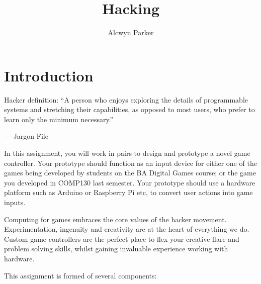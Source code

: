 \documentclass{../fal_assignment}
\title{Hacking }
\author{Alcwyn Parker}
\begin{document}
\maketitle

\section*{Introduction}

\begin{marginquote}
Hacker definition: ``A person who enjoys exploring the details of programmable systems and stretching their capabilities, as opposed to most users, who prefer to learn only the minimum necessary.''

--- Jargon File

\end{marginquote}

In this assignment, you will work in pairs to design and prototype a novel game controller. Your prototype should function as an input device for either one of the games being developed by students on the BA Digital Games course; or the game you developed in COMP130 last semester. Your prototype should use a hardware platform such as Arduino or Raspberry Pi etc, to convert user actions into game inputs. 

Computing for games embraces the core values of the hacker movement.  Experimentation, ingenuity and creativity are at the heart of everything we do. Custom game controllers are the perfect place to flex your creative flare and problem solving skills, whilst gaining invaluable experience working with hardware. 

This assignment is formed of several components:
\end{document}
